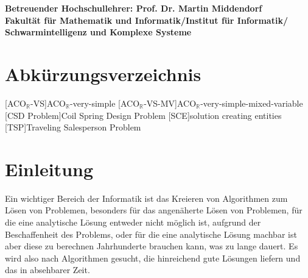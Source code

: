 \documentclass[fontsize=12, a4aper]{scrartcl}
\begin{document}
	\vfill
	
	\begin{flushleft}
		
		\textbf{Betreuender Hochschullehrer: Prof. Dr. Martin Middendorf}\\
		\textbf{\hspace{1mm} Fakultät für Mathematik und Informatik/Institut für Informatik/}\\
		\textbf{\hspace{1mm} Schwarmintelligenz und Komplexe Systeme}
		
	\end{flushleft}
	
	
	\newpage
	
	
	\tableofcontents
	\newpage
	
	
	\section*{Abkürzungsverzeichnis}
	
	\begin{acronym}[Masterarbeit]
		[ACO\(_{\mathbb{R}}\)-VS]{ACO\(_\mathbb{R}\)-very-simple}
		[ACO\(_{\mathbb{R}}\)-VS-MV]{ACO\(_\mathbb{R}\)-very-simple-mixed-variable}
		[CSD Problem]{Coil Spring Design Problem}
		[SCE]{solution creating entities}
		[TSP]{Traveling Salesperson Problem}
	\end{acronym}
	
	\label{last-roman-page}
	
	\newpage
	
	\section{Einleitung}
	
	Ein wichtiger Bereich der Informatik ist das Kreieren von Algorithmen zum Lösen von Problemen, besonders für das angenäherte Lösen von Problemen, für die eine analytische Lösung entweder nicht möglich ist, aufgrund der Beschaffenheit des Problems, oder für die eine analytische Lösung machbar ist aber diese zu berechnen Jahrhunderte brauchen kann, was zu lange dauert. Es wird also nach Algorithmen gesucht, die hinreichend gute Lösungen liefern und das in absehbarer Zeit.\hfill\newline
	
\end{document}
